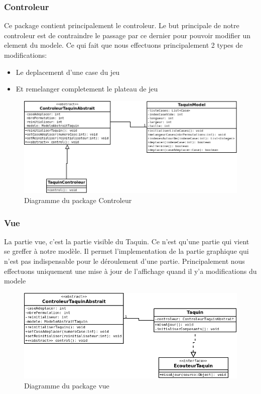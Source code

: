 \documentclass[12pt]{article}
\begin{document}
\subsubsection*{Controleur}
Ce package contient principalement le controleur. Le but principale de notre controleur 
est de contraindre le passage par ce dernier pour pouvoir modifier un element du modele.
Ce qui fait que nous effectuons principalement 2 types de modifications:
\begin{itemize}
	\item Le deplacement d'une case du jeu 
	\item Et remelanger completement le plateau de jeu
\end{itemize}
\begin{figure}[h!]
	\centering
	\includegraphics[scale=0.5]{images/DiagrammeControleur.png}
	\caption{Diagramme du package Controleur}
\end{figure}

\subsubsection*{Vue}
La partie vue, c'est la partie visible du Taquin. Ce n'est qu'une partie qui vient se greffer à notre modèle.
Il permet l'implementation de la partie graphique qui n'est pas indispensable pour le déroulement d'une partie.
Principalement nous effectuons uniquement une mise à jour de l'affichage quand il y'a modifications du modele

\begin{figure}[h!]
	\centering
	\includegraphics[scale=0.5]{images/DiagrammeVue.png}
	\caption{Diagramme du package vue}
\end{figure}
\end{document}
